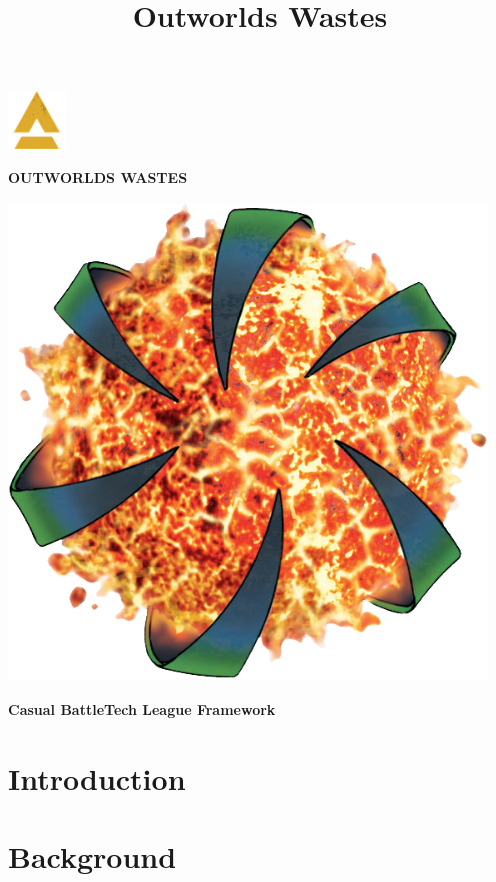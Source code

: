 \documentclass{article}
\title{Outworlds Wastes}
\newcommand{\sectiontitle}{}
\newcommand{\newsection}[2]{\renewcommand{\sectiontitle}{#2}\section{#1}}
\begin{document}
\begin{center}
  \fontsize{50}{60}\bfseries{}\includegraphics[width=0.6in,height=0.6in]{img/Battletech_A.png}\fontsize{50}{60}\bfseries{}

  \fontsize{35}{42}\bfseries\selectfont\MakeUppercase{Outworlds Wastes}

  \includegraphics[width=5in,height=5in]{img/Outworlds_Alliance.png}

  \LARGE\bfseries{Casual BattleTech League Framework}
\end{center}

\newsection{Introduction}{introduction}



\newpage

\newsection{Background}{background}
\end{document}
